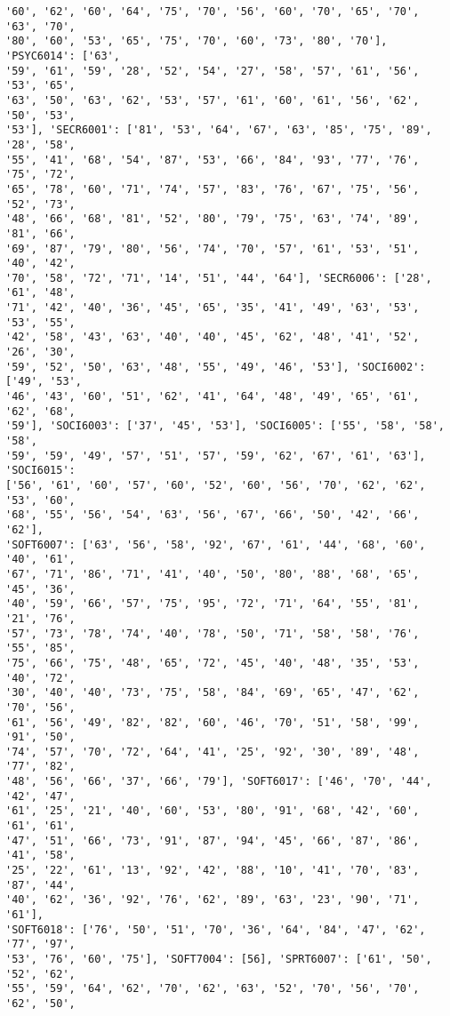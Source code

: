 \documentclass[11pt]{article}
\begin{document}
\begin{Verbatim}[commandchars=\\\{\}]
'60', '62', '60', '64', '75', '70', '56', '60', '70', '65', '70', '63', '70',
'80', '60', '53', '65', '75', '70', '60', '73', '80', '70'], 'PSYC6014': ['63',
'59', '61', '59', '28', '52', '54', '27', '58', '57', '61', '56', '53', '65',
'63', '50', '63', '62', '53', '57', '61', '60', '61', '56', '62', '50', '53',
'53'], 'SECR6001': ['81', '53', '64', '67', '63', '85', '75', '89', '28', '58',
'55', '41', '68', '54', '87', '53', '66', '84', '93', '77', '76', '75', '72',
'65', '78', '60', '71', '74', '57', '83', '76', '67', '75', '56', '52', '73',
'48', '66', '68', '81', '52', '80', '79', '75', '63', '74', '89', '81', '66',
'69', '87', '79', '80', '56', '74', '70', '57', '61', '53', '51', '40', '42',
'70', '58', '72', '71', '14', '51', '44', '64'], 'SECR6006': ['28', '61', '48',
'71', '42', '40', '36', '45', '65', '35', '41', '49', '63', '53', '53', '55',
'42', '58', '43', '63', '40', '40', '45', '62', '48', '41', '52', '26', '30',
'59', '52', '50', '63', '48', '55', '49', '46', '53'], 'SOCI6002': ['49', '53',
'46', '43', '60', '51', '62', '41', '64', '48', '49', '65', '61', '62', '68',
'59'], 'SOCI6003': ['37', '45', '53'], 'SOCI6005': ['55', '58', '58', '58',
'59', '59', '49', '57', '51', '57', '59', '62', '67', '61', '63'], 'SOCI6015':
['56', '61', '60', '57', '60', '52', '60', '56', '70', '62', '62', '53', '60',
'68', '55', '56', '54', '63', '56', '67', '66', '50', '42', '66', '62'],
'SOFT6007': ['63', '56', '58', '92', '67', '61', '44', '68', '60', '40', '61',
'67', '71', '86', '71', '41', '40', '50', '80', '88', '68', '65', '45', '36',
'40', '59', '66', '57', '75', '95', '72', '71', '64', '55', '81', '21', '76',
'57', '73', '78', '74', '40', '78', '50', '71', '58', '58', '76', '55', '85',
'75', '66', '75', '48', '65', '72', '45', '40', '48', '35', '53', '40', '72',
'30', '40', '40', '73', '75', '58', '84', '69', '65', '47', '62', '70', '56',
'61', '56', '49', '82', '82', '60', '46', '70', '51', '58', '99', '91', '50',
'74', '57', '70', '72', '64', '41', '25', '92', '30', '89', '48', '77', '82',
'48', '56', '66', '37', '66', '79'], 'SOFT6017': ['46', '70', '44', '42', '47',
'61', '25', '21', '40', '60', '53', '80', '91', '68', '42', '60', '61', '61',
'47', '51', '66', '73', '91', '87', '94', '45', '66', '87', '86', '41', '58',
'25', '22', '61', '13', '92', '42', '88', '10', '41', '70', '83', '87', '44',
'40', '62', '36', '92', '76', '62', '89', '63', '23', '90', '71', '61'],
'SOFT6018': ['76', '50', '51', '70', '36', '64', '84', '47', '62', '77', '97',
'53', '76', '60', '75'], 'SOFT7004': [56], 'SPRT6007': ['61', '50', '52', '62',
'55', '59', '64', '62', '70', '62', '63', '52', '70', '56', '70', '62', '50',

\end{Verbatim}
\end{document}
